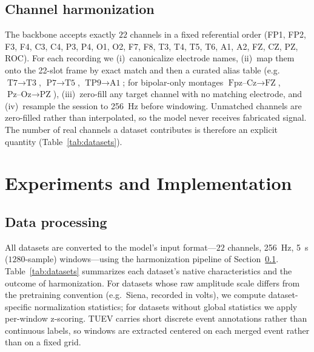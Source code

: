 \documentclass[journal]{IEEEtran}
\begin{document}
\subsection{Channel harmonization}
\label{sec:channels}
The backbone accepts exactly $22$ channels in a fixed referential order
(FP1, FP2, F3, F4, C3, C4, P3, P4, O1, O2, F7, F8, T3, T4, T5, T6, A1, A2, FZ,
CZ, PZ, ROC). For each recording we (i)~canonicalize electrode names,
(ii)~map them onto the 22-slot frame by exact match and then a curated alias
table (e.g.\ $\text{T7}\!\to\!\text{T3}$, $\text{P7}\!\to\!\text{T5}$,
$\text{TP9}\!\to\!\text{A1}$; for bipolar-only montages
$\text{Fpz--Cz}\!\to\!\text{FZ}$, $\text{Pz--Oz}\!\to\!\text{PZ}$),
(iii)~zero-fill any target channel with no matching electrode, and
(iv)~resample the session to \SI{256}{\hertz} before windowing. Unmatched
channels are zero-filled rather than interpolated, so the model never receives
fabricated signal. The number of real channels a dataset contributes is
therefore an explicit quantity (Table~\ref{tab:datasets}).

\section{Experiments and Implementation}
\subsection{Data processing}
All datasets are converted to the model's input format---$22$ channels,
\SI{256}{\hertz}, \SI{5}{\second} ($1280$-sample) windows---using the
harmonization pipeline of Section~\ref{sec:channels}. Table~\ref{tab:datasets}
summarizes each dataset's native characteristics and the outcome of
harmonization. For datasets whose raw amplitude scale differs from the
pretraining convention (e.g.\ Siena, recorded in volts), we compute
dataset-specific normalization statistics; for datasets without global
statistics we apply per-window z-scoring. TUEV carries short discrete event
annotations rather than continuous labels, so windows are extracted centered on
each merged event rather than on a fixed grid.
\end{document}
